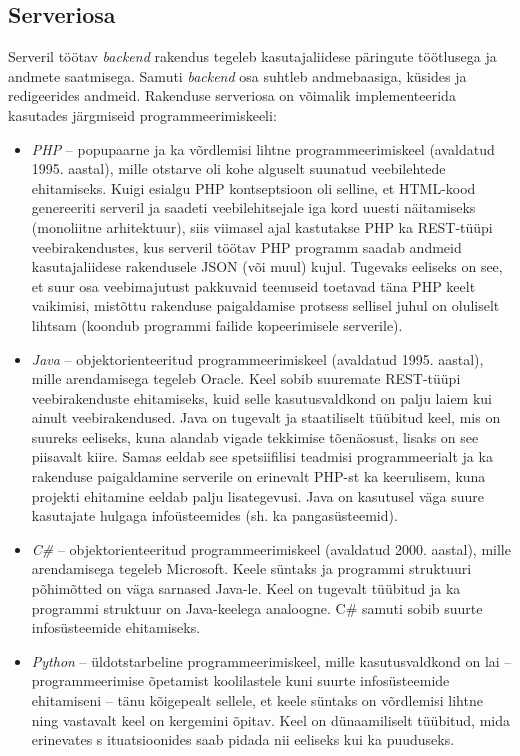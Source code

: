 \subsection{Serveriosa}
Serveril töötav \textit{backend} rakendus tegeleb kasutajaliidese päringute töötlusega ja andmete saatmisega.
Samuti \textit{backend} osa suhtleb andmebaasiga, küsides ja redigeerides andmeid. Rakenduse serveriosa on võimalik
implementeerida kasutades järgmiseid programmeerimiskeeli:
\begin{itemize}
    \item \textit{PHP} -- popupaarne ja ka võrdlemisi lihtne programmeerimiskeel (avaldatud 1995. aastal), 
    mille otstarve oli kohe alguselt suunatud veebilehtede ehitamiseks. Kuigi esialgu PHP kontseptsioon oli selline, 
    et HTML-kood genereeriti serveril ja saadeti veebilehitsejale iga kord uuesti näitamiseks (monoliitne arhitektuur), 
    siis viimasel ajal kastutakse PHP ka REST-tüüpi veebirakendustes, kus serveril töötav PHP programm saadab 
    andmeid kasutajaliidese rakendusele JSON (või muul) kujul. Tugevaks eeliseks on see, et suur osa veebimajutust 
    pakkuvaid teenuseid toetavad täna PHP keelt vaikimisi, mistõttu rakenduse paigaldamise protsess sellisel juhul 
    on oluliselt lihtsam (koondub programmi failide kopeerimisele serverile).
    \item \textit{Java} -- objektorienteeritud programmeerimiskeel (avaldatud 1995. aastal), mille arendamisega 
    tegeleb Oracle. Keel sobib suuremate REST-tüüpi veebirakenduste ehitamiseks, kuid selle kasutusvaldkond on palju laiem kui 
    ainult veebirakendused. Java on tugevalt ja staatiliselt tüübitud keel, mis on suureks eeliseks, kuna alandab
    vigade tekkimise tõenäosust, lisaks on see piisavalt kiire.  Samas eeldab see spetsiifilisi teadmisi 
    programmeerialt ja ka rakenduse paigaldamine serverile on erinevalt PHP-st ka keerulisem, kuna projekti 
    ehitamine eeldab palju lisategevusi. Java on kasutusel väga suure kasutajate hulgaga infoüsteemides (sh. ka pangasüsteemid).
    \item \textit{C\#} -- objektorienteeritud programmeerimiskeel (avaldatud 2000. aastal), mille arendamisega tegeleb Microsoft. 
    Keele süntaks ja programmi struktuuri põhimõtted on väga sarnased Java-le. Keel on tugevalt tüübitud ja 
    ka programmi struktuur on Java-keelega analoogne. C\# samuti sobib suurte infosüsteemide ehitamiseks.
    \item \textit{Python} --  üldotstarbeline programmeerimiskeel, mille kasutusvaldkond on lai -- programmeerimise 
    õpetamist koolilastele kuni suurte infosüsteemide ehitamiseni -- tänu kõigepealt sellele, et keele süntaks on 
    võrdlemisi lihtne ning vastavalt keel on kergemini õpitav. Keel on dünaamiliselt tüübitud, mida erinevates s
    ituatsioonides saab pidada nii eeliseks kui ka puuduseks.
\end{itemize}

